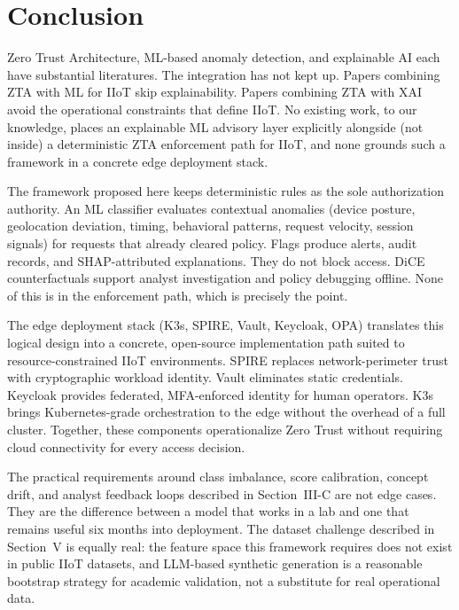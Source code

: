 \documentclass[conference]{IEEEtran}
\begin{document}
\section{Conclusion}

Zero Trust Architecture, ML-based anomaly detection, and explainable AI each have substantial literatures. The integration has not kept up. Papers combining ZTA with ML for IIoT skip explainability. Papers combining ZTA with XAI avoid the operational constraints that define IIoT. No existing work, to our knowledge, places an explainable ML advisory layer explicitly alongside (not inside) a deterministic ZTA enforcement path for IIoT, and none grounds such a framework in a concrete edge deployment stack.

The framework proposed here keeps deterministic rules as the sole authorization authority. An ML classifier evaluates contextual anomalies (device posture, geolocation deviation, timing, behavioral patterns, request velocity, session signals) for requests that already cleared policy. Flags produce alerts, audit records, and SHAP-attributed explanations. They do not block access. DiCE counterfactuals support analyst investigation and policy debugging offline. None of this is in the enforcement path, which is precisely the point.

The edge deployment stack (K3s, SPIRE, Vault, Keycloak, OPA) translates this logical design into a concrete, open-source implementation path suited to resource-constrained IIoT environments. SPIRE replaces network-perimeter trust with cryptographic workload identity. Vault eliminates static credentials. Keycloak provides federated, MFA-enforced identity for human operators. K3s brings Kubernetes-grade orchestration to the edge without the overhead of a full cluster. Together, these components operationalize Zero Trust without requiring cloud connectivity for every access decision.

The practical requirements around class imbalance, score calibration, concept drift, and analyst feedback loops described in Section~III-C are not edge cases. They are the difference between a model that works in a lab and one that remains useful six months into deployment. The dataset challenge described in Section~V is equally real: the feature space this framework requires does not exist in public IIoT datasets, and LLM-based synthetic generation is a reasonable bootstrap strategy for academic validation, not a substitute for real operational data.
\end{document}
